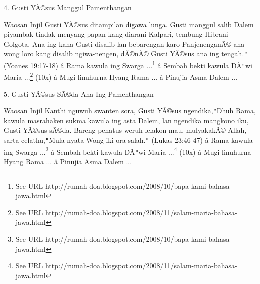 
4. Gusti Y\~A\copyright{}sus Manggul Pamenthangan

\newline


Waosan Injil
Gusti Y\~A\copyright{}sus ditampilan digawa lunga. Gusti manggul salib Dalem piyambak tindak menyang papan kang diarani Kalpari, tembung Hibrani Golgota. Ana ing kana Gusti disalib lan bebarengan karo Panjenengan\~A\copyright{} ana wong loro kang disalib ngiwa-nengen, d\~A\copyright{}n\~A\copyright{} Gusti Y\~A\copyright{}sus ana ing tengah.\texttt{{}"{}} (Yoanes 19:17-18)
\newline
 \^a\*  Rama kawula ing Swarga ...\footnote{See URL http://rumah-doa.blogspot.com/2008/10/bapa-kami-bahasa-jawa.html}\newline
 \^a\*  Sembah bekti kawula D\~A\texttt{{}"{}}wi Maria ...\footnote{See URL http://rumah-doa.blogspot.com/2008/11/salam-maria-bahasa-jawa.html} (10x)\newline
 \^a\*  Mugi linuhurna Hyang Rama ...\newline
 \^a\*  Pinujia Asma Dalem ...\newline


5. Gusti Y\~A\copyright{}sus S\~A\copyright{}da Ana Ing Pamenthangan

\newline


Waosan Injil
Kanthi nguwuh swanten sora, Gusti Y\~A\copyright{}sus ngendika,\texttt{{}"{}}Dhuh Rama, kawula masrahaken sukma kawula ing asta Dalem, lan ngendika mangkono iku, Gusti Y\~A\copyright{}sus s\~A\copyright{}da. Bareng penatus weruh lelakon mau, mulyakak\~A\copyright{} Allah, sarta celathu,\texttt{{}"{}}Mula nyata Wong iki ora salah.\texttt{{}"{}} (Lukas 23:46-47)
\newline
 \^a\*  Rama kawula ing Swarga ...\footnote{See URL http://rumah-doa.blogspot.com/2008/10/bapa-kami-bahasa-jawa.html}\newline
 \^a\*  Sembah bekti kawula D\~A\texttt{{}"{}}wi Maria ...\footnote{See URL http://rumah-doa.blogspot.com/2008/11/salam-maria-bahasa-jawa.html} (10x)\newline
 \^a\*  Mugi linuhurna Hyang Rama ...\newline
 \^a\*  Pinujia Asma Dalem ...\newline

